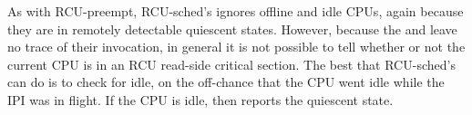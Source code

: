 \begin{center}
\end{center}

As with RCU-preempt, RCU-sched's  ignores
offline and idle CPUs, again because they are in remotely detectable
quiescent states.
However, because the  and
 leave no trace of their invocation, in
general it is not possible to tell whether or not the current CPU is in
an RCU read-side critical section.
The best that RCU-sched's
 can do is to check for idle, on the off-chance
that the CPU went idle while the IPI was in flight.
If the CPU is idle,
then  reports the quiescent state.

